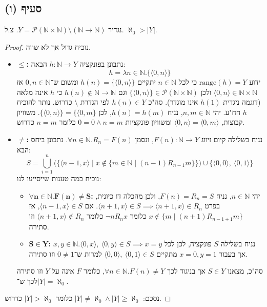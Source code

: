 \documentclass[]{article}
\newcommand\N     {\mathbb{N}}
\newcommand\ps    {\mathcal{P}}
\newcommand\ra    {\rangle}
\newcommand\la    {\langle}
\newcommand\range {\text{range}}
\newcommand\az    {\aleph_0}
\begin{document}
	\subsection*{סעיף (ו)}
	נגדיר $ Y = \ps(\N \times \N) \setminus (\N\to \N) $. צ.ל. $ \az > |Y| $. 
	\begin{proof}
		נוכיח גדול אך לא שווה. 
		\begin{itemize}
			\item $ \bm{\le} $\textbf{: }נתבונן בפונקציה $ h \colon \N \to Y $ הבאה: 
			\[ h = \lambda n \in \N. \{\la 0, n \ra\} \]
			ידוע $ \range(h) = Y $ כי לכל $ n \in \N $ יתקיים $ h(n) = \{\la 0, n \ra\} $ ומשום ש־$ 0, n \in \N $ אז $ \la 0, n \ra \in \N \times \N  $ ולכן $ \{\la 0, n \ra\} \in \ps(\N \times \N) $ וגם $ h(n) \not\in \N \to \N $ כי $ h $ אינה מלאה (דוגמה ניגדית $ h(1) $ אינו מוגדר). סה"כ $ h(n) \in Y $ לפי הגדרת $ \setminus $ כדרוש. נותר להוכיח $ h $ חח"ע. יהי $ n, m \in \N $, נניח $ h(n) = h(m) $, לכן $ \{\la 0, n \ra\} = \{\la 0, m\} $. משוויון קבוצות, $ \la 0, n \ra = \la 0, m \ra $ ומשוויון פונקציות $ 0 = 0 \land n = m $ כלומר $ n = m $ כדרוש. 
			\item $ \bm{\neq} $\textbf{: }נניח בשלילה קיום זיווג $ F(n) \colon \N \to Y $, ונסמן $ \forall n \in \N. R_n = F(n) $. נתבונן ביחס הבא: 
			\[ S = \bigcup_{i = 1}^n \Big(\big \{ \la n - 1, x \ra \mid x \not\in \{m \in \N \mid (n - 1)R_{n - 1}m \} \big\} \Big) \cup \{\la 0, 0 \ra, \ \la 0, 1 \ra \}\]
			נוכיח כמה טענות שייסייעו לנו: 
			\begin{itemize}
				\item $ \bm{\forall n \in \N. F(n) \neq S} $\textbf{: }יהי $ n \in \N $, נניח $ F(n) = R_n = S $, ולכן מהכלה דו כיונית, בפרט $ \la n + 1, x \ra \in S \implies \la n + 1, x \ra \in R_n$. אם $ \la n - 1, x \ra \in S $, אז $ x \not\in \{m \mid (n + 1)R_{n - 1 + 1}m\} $ כלומר $ \lnot nR_nx $ כלומר $ \la n + 1, x \ra \not\in R_n $ וזו סתירה. 
				\item $ \bm{S \in Y} $\textbf{: }נניח בשלילה $ S $ פונקציה, לכן לכל $ x, y \in \N. \la 0, x \ra, \ \la 0, y \ra \in S \implies x = y$ אך בעבור $ x = 0, y = 1 $ מתקיים $ \la 0, 0 \ra, \ \la 0, 1 \ra \in S $ למרות ש־$ 0 \neq 1 $ וזו סתירה. 
			\end{itemize}
			סה"כ, מצאנו $ S \in Y $ אך בניגוד לכך $ \forall n \in \N. F(n) \neq Y $, כלומר $ F $ אינה על $ Y $ וזו סתירה לכך ש־$ |Y| = \az $. 
		\end{itemize}
		נסכם: $ |Y| \neq \az \land |Y| \ge \az $ כלומר $ |Y| > \az $ כדרוש. 
	\end{proof}
\end{document}
